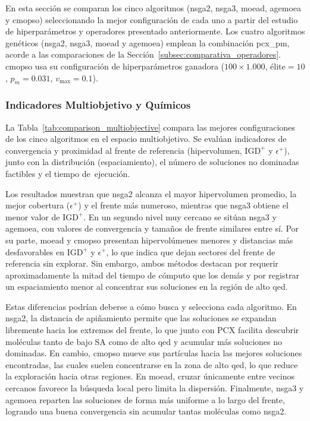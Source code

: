 En esta sección se comparan los cinco algoritmos (\acrshort{nsga2}, \acrshort{nsga3}, \acrshort{moead}, \acrshort{agemoea} y \acrshort{cmopso}) seleccionando la mejor configuración de cada uno a partir del estudio de hiperparámetros y operadores presentado anteriormente. Los cuatro algoritmos genéticos (\acrshort{nsga2}, \acrshort{nsga3}, \acrshort{moead} y \acrshort{agemoea}) emplean la combinación pcx\_pm, acorde a las comparaciones de la Sección~\ref{subsec:comparativa_operadores}. \acrshort{cmopso} usa su configuración de hiperparámetros ganadora ($100\times \text{1.000}$, $\text{élite}=10$, $p_m=0.031$, $v_{\text{max}}=0.1$).

\subsubsection{Indicadores Multiobjetivo y Químicos}

La Tabla~\ref{tab:comparison_multiobjective} compara las mejores configuraciones de los cinco algoritmos en el espacio multiobjetivo. Se evalúan indicadores de convergencia y proximidad al frente de referencia (hipervolumen, $\text{IGD}^+$ y $\epsilon^+$), junto con la distribución (espaciamiento), el número de soluciones no dominadas factibles y el tiempo de~ejecución.




Los resultados muestran que \acrshort{nsga2} alcanza el mayor hipervolumen promedio, la mejor cobertura ($\epsilon^+$) y el frente más numeroso, mientras que \acrshort{nsga3} obtiene el menor valor de $\text{IGD}^+$. En un segundo nivel muy cercano se sitúan \acrshort{nsga3} y \acrshort{agemoea}, con valores de convergencia y tamaños de frente similares entre sí. Por su parte, \acrshort{moead} y \acrshort{cmopso} presentan hipervolúmenes menores y distancias más desfavorables en $\text{IGD}^+$ y $\epsilon^+$, lo que indica que dejan sectores del frente de referencia sin explorar. Sin embargo, ambos métodos destacan por requerir aproximadamente la mitad del tiempo de cómputo que los demás y por registrar un espaciamiento menor al concentrar sus soluciones en la región de alto \gls{qed}.

Estas diferencias podrían deberse a cómo busca y selecciona cada algoritmo. En \acrshort{nsga2}, la distancia de apiñamiento permite que las soluciones se expandan libremente hacia los extremos del frente, lo que junto con PCX facilita descubrir moléculas tanto de bajo SA como de alto \gls{qed} y acumular más soluciones no dominadas. En cambio, \acrshort{cmopso} mueve sus partículas hacia las mejores soluciones encontradas, las cuales suelen concentrarse en la zona de alto \gls{qed}, lo que reduce la exploración hacia otras regiones. En \acrshort{moead}, cruzar únicamente entre vecinos cercanos favorece la búsqueda local pero limita la dispersión. Finalmente, \acrshort{nsga3} y \acrshort{agemoea} reparten las soluciones de forma más uniforme a lo largo del frente, logrando una buena convergencia sin acumular tantas moléculas como \acrshort{nsga2}.

